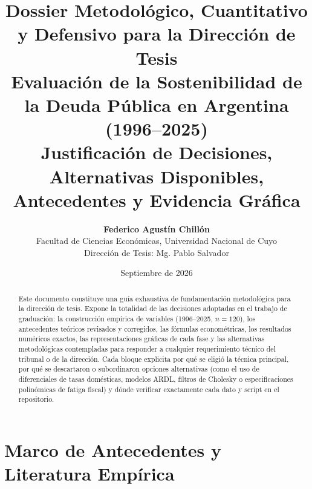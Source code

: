 \documentclass[11pt,a4paper]{article}
\title{\textbf{\Large Dossier Metodológico, Cuantitativo y Defensivo para la Dirección de Tesis}\\
\large Evaluación de la Sostenibilidad de la Deuda Pública en Argentina (1996--2025)\\[0.3em]
\normalsize Justificación de Decisiones, Alternativas Disponibles, Antecedentes y Evidencia Gráfica}
\author{\textbf{Federico Agustín Chillón} \\
Facultad de Ciencias Económicas, Universidad Nacional de Cuyo \\
Dirección de Tesis: Mg. Pablo Salvador}
\date{Septiembre de 2026}
\begin{document}
\maketitle

\begin{abstract}
\noindent Este documento constituye una guía exhaustiva de fundamentación metodológica para la dirección de tesis. Expone la totalidad de las decisiones adoptadas en el trabajo de graduación: la construcción empírica de variables (1996--2025, $n=120$), los antecedentes teóricos revisados y corregidos, las fórmulas econométricas, los resultados numéricos exactos, las representaciones gráficas de cada fase y las alternativas metodológicas contempladas para responder a cualquier requerimiento técnico del tribunal o de la dirección. Cada bloque explicita por qué se eligió la técnica principal, por qué se descartaron o subordinaron opciones alternativas (como el uso de diferenciales de tasas domésticas, modelos ARDL, filtros de Cholesky o especificaciones polinómicas de fatiga fiscal) y dónde verificar exactamente cada dato y script en el repositorio.
\end{abstract}

\vspace{0.8em}

\section{Marco de Antecedentes y Literatura Empírica}
\end{document}
